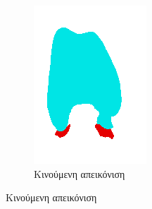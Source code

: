 \documentclass[a4paper,12pt]{article}
\begin{document}
\begin{figure}[H]
\begin{subfigure}[t]{0.4\linewidth}
    \includegraphics[width=\linewidth]{moving_label_before_registration_3.png}
    \caption{Κινούμενη απεικόνιση}
    \end{subfigure}


\end{figure}
\end{document}
